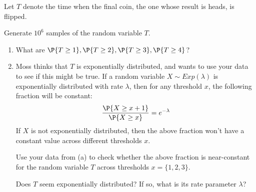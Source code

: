 \documentclass{article}
\begin{document}
\begin{enumerate}
    Let $T$ denote the time when the final coin, the one whose result is heads, is flipped.

    Generate $10^6$ samples of the random variable $T$.
    \begin{enumerate}
    \item What are $\P{T \ge 1}, \P{T \ge 2}, \P{T \ge 3}, \P{T \ge 4}$?
    \item Moss thinks that $T$ is exponentially distributed,
    and wants to use your data to see if this might be true.
    If a random variable $X \sim Exp(\lambda)$
    is exponentially distributed with rate $\lambda$,
    then for any threshold $x$, the following fraction will be constant:
    \begin{align*}
        \frac{\P{X \ge x+1}}{\P{X \ge x}} = e^{-\lambda}
    \end{align*}
    If $X$ is not exponentially distributed, then the above fraction won't have a constant value across different thresholds $x$.

    Use your data from (a) to check whether the above fraction is near-constant for the random variable $T$ across thresholds $x = \{1, 2, 3\}$.
    
    Does $T$ seem exponentially distributed? If so, what is its rate parameter $\lambda$?
    \end{enumerate}
\end{enumerate}
\end{document}
